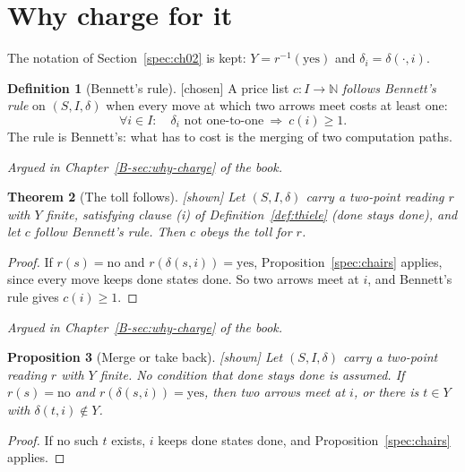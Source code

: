\documentclass[11pt, a4paper]{article}
\theoremstyle{plain}
\newtheorem{theorem}{Theorem}[section]
\newtheorem{proposition}[theorem]{Proposition}
\theoremstyle{definition}
\newtheorem{definition}[theorem]{Definition}
\theoremstyle{remark}
\newcommand{\N}{\mathbb{N}}
\newcommand{\step}{\delta}
\newcommand{\cost}{c}
\newcommand{\rd}{r}
\newcommand{\inv}{^{-1}}
\newcommand{\argued}[1]{\par\noindent\textit{Argued in Chapter~\ref{B-#1} of the book.}\par}
\newcommand{\kind}[1]{\textup{[#1]}}
\begin{document}
\section{Why charge for it}\label{spec:ch03}

The notation of Section~\ref{spec:ch02} is kept: $Y=\rd\inv(\mathrm{yes})$ and $\step_i=\step(\cdot,i)$.

\begin{definition}[Bennett's rule]\label{spec:bennett} \kind{chosen}
A price list $\cost:I\to\N$ \emph{follows Bennett's rule} on $(S,I,\step)$ when every move at which two
arrows meet costs at least one:
\[
\forall i\in I:\quad \step_i \text{ not one-to-one}\ \Longrightarrow\ \cost(i)\ge1 .
\]
The rule is Bennett's: what has to cost is the merging of two computation paths.
\end{definition}

\argued{sec:why-charge}

\begin{theorem}[The toll follows]\label{spec:toll-follows} \kind{shown}
Let $(S,I,\step)$ carry a two-point reading $\rd$ with $Y$ finite, satisfying clause (i) of
Definition~\ref{def:thiele} (done stays done), and let $\cost$ follow Bennett's rule. Then $\cost$ obeys
the toll for $\rd$.
\end{theorem}

\begin{proof}
If $\rd(s)=\mathrm{no}$ and $\rd(\step(s,i))=\mathrm{yes}$, Proposition~\ref{spec:chairs} applies, since
every move keeps done states done. So two arrows meet at $i$, and Bennett's rule gives $\cost(i)\ge1$.
\end{proof}

\argued{sec:why-charge}

\begin{proposition}[Merge or take back]\label{spec:merge-or-revoke} \kind{shown}
Let $(S,I,\step)$ carry a two-point reading $\rd$ with $Y$ finite. No condition that done stays done is
assumed. If $\rd(s)=\mathrm{no}$ and $\rd(\step(s,i))=\mathrm{yes}$, then two arrows meet at $i$, or there
is $t\in Y$ with $\step(t,i)\notin Y$.
\end{proposition}

\begin{proof}
If no such $t$ exists, $i$ keeps done states done, and Proposition~\ref{spec:chairs} applies.
\end{proof}
\end{document}
